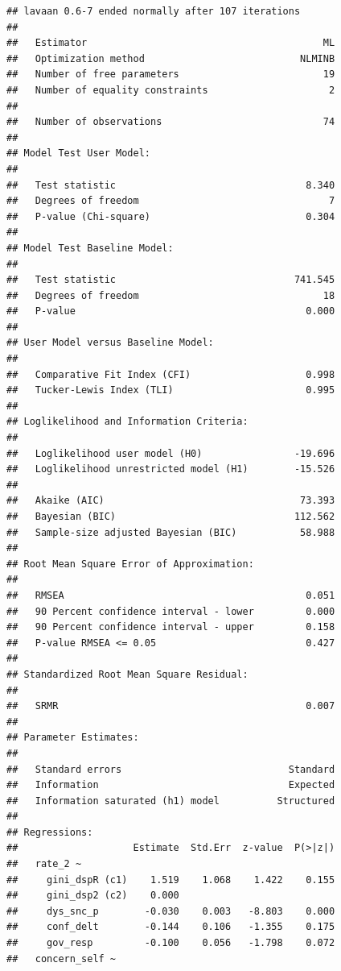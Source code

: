 \documentclass[
]{article}
\begin{document}
\begin{verbatim}
## lavaan 0.6-7 ended normally after 107 iterations
## 
##   Estimator                                         ML
##   Optimization method                           NLMINB
##   Number of free parameters                         19
##   Number of equality constraints                     2
##                                                       
##   Number of observations                            74
##                                                       
## Model Test User Model:
##                                                       
##   Test statistic                                 8.340
##   Degrees of freedom                                 7
##   P-value (Chi-square)                           0.304
## 
## Model Test Baseline Model:
## 
##   Test statistic                               741.545
##   Degrees of freedom                                18
##   P-value                                        0.000
## 
## User Model versus Baseline Model:
## 
##   Comparative Fit Index (CFI)                    0.998
##   Tucker-Lewis Index (TLI)                       0.995
## 
## Loglikelihood and Information Criteria:
## 
##   Loglikelihood user model (H0)                -19.696
##   Loglikelihood unrestricted model (H1)        -15.526
##                                                       
##   Akaike (AIC)                                  73.393
##   Bayesian (BIC)                               112.562
##   Sample-size adjusted Bayesian (BIC)           58.988
## 
## Root Mean Square Error of Approximation:
## 
##   RMSEA                                          0.051
##   90 Percent confidence interval - lower         0.000
##   90 Percent confidence interval - upper         0.158
##   P-value RMSEA <= 0.05                          0.427
## 
## Standardized Root Mean Square Residual:
## 
##   SRMR                                           0.007
## 
## Parameter Estimates:
## 
##   Standard errors                             Standard
##   Information                                 Expected
##   Information saturated (h1) model          Structured
## 
## Regressions:
##                    Estimate  Std.Err  z-value  P(>|z|)
##   rate_2 ~                                            
##     gini_dspR (c1)    1.519    1.068    1.422    0.155
##     gini_dsp2 (c2)    0.000                           
##     dys_snc_p        -0.030    0.003   -8.803    0.000
##     conf_delt        -0.144    0.106   -1.355    0.175
##     gov_resp         -0.100    0.056   -1.798    0.072
##   concern_self ~                                      

\end{verbatim}
\end{document}
